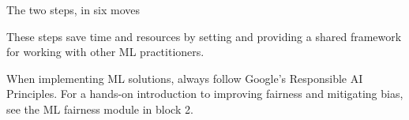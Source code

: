 \begin{frame}{The two steps, in six moves}
  \begin{withmargin}
    \begin{tdmargin}
      These steps save time and resources by setting  and
      providing a shared framework for working with other ML practitioners.
      \par\medskip
      When implementing ML solutions, always follow Google's Responsible AI
      Principles. For a hands-on introduction to improving fairness and
      mitigating bias, see the ML fairness module in block 2.
    \end{tdmargin}
  \end{withmargin}
\end{frame}
